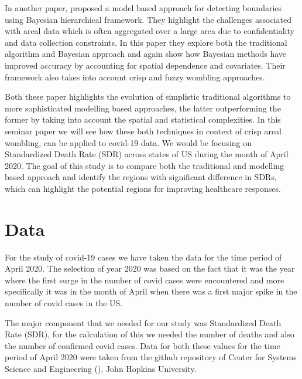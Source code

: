 \documentclass[enabledeprecatedfontcommands,parskip=half,twoside=semi,BCOR=0mm]{scrreprt}
\numberwithin{equation}{chapter}
\theoremstyle{definition}
\theoremstyle{remark}
\begin{document}
    In another paper, \cite{Lu_Carlin.2005} proposed a model based approach for detecting boundaries using Bayesian hierarchical framework. They highlight the challenges associated with areal data which is often aggregated over a large area due to confidentiality and data collection constraints. In this paper they explore both the traditional algorithm and Bayesian approach and again show how Bayesian methods have improved accuracy by accounting for spatial dependence and covariates. Their framework also takes into account crisp and fuzzy wombling approaches.
        
    Both these paper highlights the evolution of simplistic traditional algorithms to more sophisticated modelling based approaches, the latter outperforming the former by taking into account the spatial and statistical complexities. In this seminar paper we will see how these both techniques in context of crisp areal wombling, can be applied to covid-19 data. We would be focusing on Standardized Death Rate (SDR) across states of US during the month of April 2020. The goal of this study is to compare both the traditional and modelling based approach and identify the regions with significant difference in SDRs, which can highlight the potential regions for improving healthcare responses.

    \chapter{Data}
    For the study of covid-19 cases we have taken the data for the time period of April 2020. The selection of year 2020 was based on the fact that it was the year where the first surge in the number of covid cases were encountered and more specifically it was in the month of April when there was a first major spike in the number of covid cases in the US.  
    
    The major component that we needed for our study was Standardized Death Rate (SDR), for the calculation of this we needed the number of deaths and also the number of confirmed covid cases. Data for both these values for the time period of April 2020 were taken from the github repository of Center for Systems Science and Engineering (\cite{CSSE}), John Hopkins University. 
    
\end{document}
